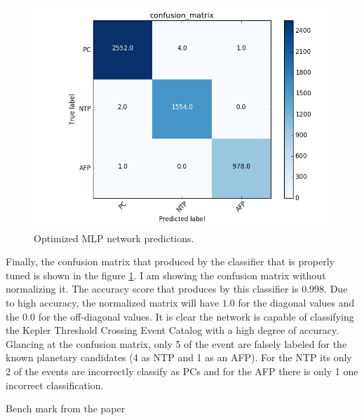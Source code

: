 \begin{figure}[!h]
\begin{center}
        \includegraphics[width=0.5\textheight]{img/confusion_matrix_good.png}
        \caption{Optimized MLP network predictions.}  \label{fig:confusiongood}
\end{center}
\end{figure}


Finally, the confusion matrix that produced by the classifier that is properly tuned is shown in the figure \ref{fig:confusiongood}. I am showing the confusion matrix without normalizing it. The accuracy score that produces by this classifier is $0.998$. Due to high accuracy, the normalized matrix will have $1.0$ for the diagonal values and the $0.0$ for the off-diagonal values. It is clear the network is capable of classifying the Kepler Threshold Crossing Event Catalog with a high degree of accuracy. Glancing at the confusion matrix,  only 5 of the event are falsely labeled for the known planetary candidates (4 as NTP and 1 as an AFP). For the NTP its only 2 of the events are incorrectly classify as PCs and for the AFP there is only 1 one incorrect classification. 

Bench mark from the paper

